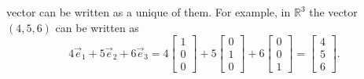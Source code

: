 vector can be written as a unique \emph{} of them.
For example, in ${\mathbb R}^3$ the vector $(4,5,6)$ can be written as
\begin{equation*}
4 \vec{e}_1 +
5 \vec{e}_2 +
6 \vec{e}_3
=
4
\begin{bmatrix}
1 \\ 0 \\ 0
\end{bmatrix}
+
5
\begin{bmatrix}
0 \\ 1 \\ 0
\end{bmatrix}
+
6
\begin{bmatrix}
0 \\ 0 \\ 1
\end{bmatrix}
=
\begin{bmatrix}
4 \\ 5 \\ 6
\end{bmatrix} .
\end{equation*}

